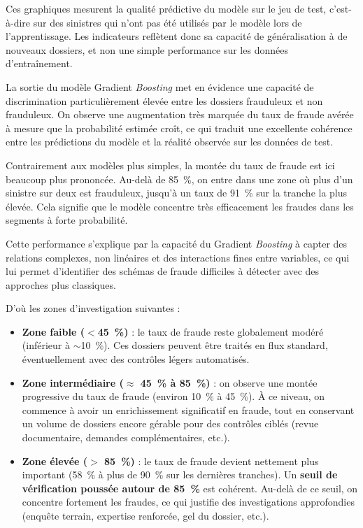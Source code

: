 Ces graphiques mesurent la qualité prédictive du modèle sur le jeu de test, c'est-à-dire sur des sinistres qui n'ont pas été utilisés par le modèle lors de l'apprentissage. Les indicateurs reflètent donc sa capacité de généralisation à de nouveaux dossiers, et non une simple performance sur les données d'entraînement.

La sortie du modèle Gradient \textit{Boosting} met en évidence une capacité de discrimination particulièrement élevée entre les dossiers frauduleux et non frauduleux. On observe une augmentation très marquée du taux de fraude avérée à mesure que la probabilité estimée croît, ce qui traduit une excellente cohérence entre les prédictions du modèle et la réalité observée sur les données de test.

Contrairement aux modèles plus simples, la montée du taux de fraude est ici beaucoup plus prononcée. Au-delà de 85~\%, on entre dans une zone où plus d'un sinistre sur deux est frauduleux, jusqu'à un taux de 91~\% sur la tranche la plus élevée. Cela signifie que le modèle concentre très efficacement les fraudes dans les segments à forte probabilité.

Cette performance s'explique par la capacité du Gradient \textit{Boosting} à capter des relations complexes, non linéaires et des interactions fines entre variables, ce qui lui permet d'identifier des schémas de fraude difficiles à détecter avec des approches plus classiques.

D'où les zones d'investigation suivantes :

\begin{itemize}[label = $\bullet$]
    \item \textbf{Zone faible ($<$45~\%)} : le taux de fraude reste globalement modéré (inférieur à $\sim$10~\%). Ces dossiers peuvent être traités en flux standard, éventuellement avec des contrôles légers automatisés.
    \item \textbf{Zone intermédiaire ($\approx$ 45~\% à 85~\%)} : on observe une montée progressive du taux de fraude (environ 10~\% à 45~\%). À ce niveau, on commence à avoir un enrichissement significatif en fraude, tout en conservant un volume de dossiers encore gérable pour des contrôles ciblés (revue documentaire, demandes complémentaires, etc.).
    \item \textbf{Zone élevée ($>$ 85~\%)} : le taux de fraude devient nettement plus important (58~\% à plus de 90~\% sur les dernières tranches). Un \textbf{seuil de vérification poussée autour de 85~\%} est cohérent. Au-delà de ce seuil, on concentre fortement les fraudes, ce qui justifie des investigations approfondies (enquête terrain, expertise renforcée, gel du dossier, etc.).
\end{itemize}

